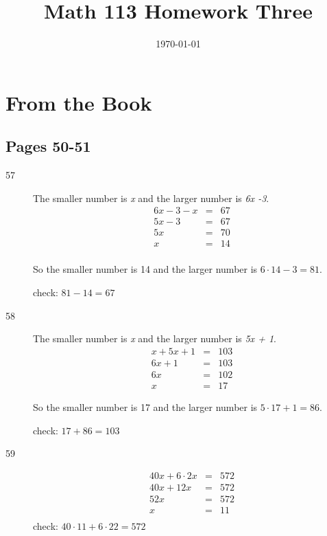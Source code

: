 \documentclass{exam}
\title{Math 113 Homework Three}
\author{}
\date{\today}
\begin{document}
\maketitle

\section{From the Book}

\ifprintanswers

\subsection{Pages 50-51}

\begin{description}

\item[57]
The smaller number is {\em x} and the larger number is {\em 6x -3}.
\begin{eqnarray*}
  6x -3 -x & = & 67 \\
  5x - 3 & = &  67 \\
  5x & = & 70 \\
  x & = & 14 \\
\end{eqnarray*}

So the smaller number is 14 and the larger number is \( 6 \cdot 14 - 3 = 81 \).

check: \( 81 - 14 = 67 \)

\item[58]
The smaller number is {\em x} and the larger number is {\em 5x + 1}.
\begin{eqnarray*}
  x + 5x + 1 & = & 103 \\
  6x + 1 & = & 103 \\
  6x & = & 102 \\
  x & = & 17
\end{eqnarray*}

So the smaller number is 17 and the larger number is \( 5 \cdot 17 + 1 = 86 \).

check: \( 17 + 86 = 103 \)

\item[59]
\begin{eqnarray*}
  40x + 6 \cdot 2x & = & 572 \\
  40x + 12x & = & 572 \\
  52x & = & 572 \\
  x & = & 11 \\
\end{eqnarray*}
check: \(40 \cdot 11 + 6 \cdot 22 = 572 \)


\end{description}
\end{document}
